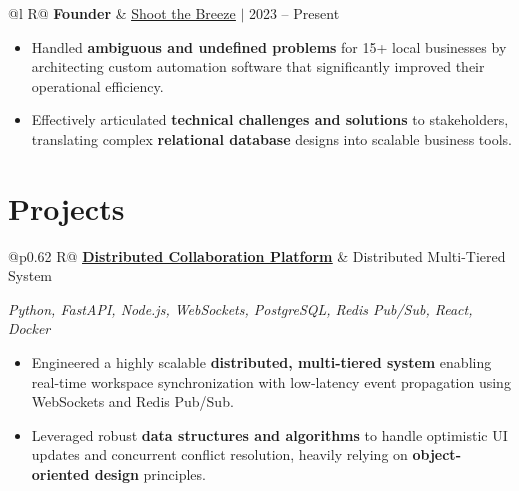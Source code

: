 \documentclass[a4paper,10pt]{article}
\newcommand{\ulink}[2]{\href{#1}{\uline{#2}}}
\newcommand{\subheading}[1]{{\color[HTML]{0A0A0A}\fontsize{12}{14}\selectfont\bfseries #1}}
\newcommand{\techstack}[1]{{\color[HTML]{5C5C5C}\fontsize{10.5}{12.5}\selectfont\itshape #1}}
\newcommand{\meta}[1]{{\color[HTML]{5C5C5C}\fontsize{10.5}{12.5}\selectfont #1}}
\begin{document}
\vspace{2pt}

\begin{tabularx}{\linewidth}{@{}l R@{}}
\subheading{Founder} & \meta{\ulink{https://shoot-the-breeze.vercel.app}{Shoot the Breeze} $|$ 2023 -- Present}
\end{tabularx}
\begin{itemize}[nosep, leftmargin=1.5em, itemsep=1pt, topsep=2pt]
  \item {\color[HTML]{0A0A0A}\fontsize{11}{14}\selectfont Handled \textbf{ambiguous and undefined problems} for 15+ local businesses by architecting custom automation software that significantly improved their operational efficiency.}
  \item {\color[HTML]{0A0A0A}\fontsize{11}{14}\selectfont Effectively articulated \textbf{technical challenges and solutions} to stakeholders, translating complex \textbf{relational database} designs into scalable business tools.}
\end{itemize}

\vspace{2pt}

\section{Projects}
\vspace{2pt}

\begin{tabularx}{\linewidth}{@{}p{0.62\linewidth} R@{}}
\subheading{\ulink{https://github.com/su-jin1425/Distributed-Collaboration-Platform}{Distributed Collaboration Platform}} & \meta{Distributed Multi-Tiered System}
\end{tabularx}
\vspace{1pt}
\techstack{Python, FastAPI, Node.js, WebSockets, PostgreSQL, Redis Pub/Sub, React, Docker}
\begin{itemize}[nosep, leftmargin=1.5em, itemsep=1pt, topsep=2pt]
  \item {\color[HTML]{0A0A0A}\fontsize{11}{14}\selectfont Engineered a highly scalable \textbf{distributed, multi-tiered system} enabling real-time workspace synchronization with low-latency event propagation using WebSockets and Redis Pub/Sub.}
  \item {\color[HTML]{0A0A0A}\fontsize{11}{14}\selectfont Leveraged robust \textbf{data structures and algorithms} to handle optimistic UI updates and concurrent conflict resolution, heavily relying on \textbf{object-oriented design} principles.}
\end{itemize}
\end{document}
